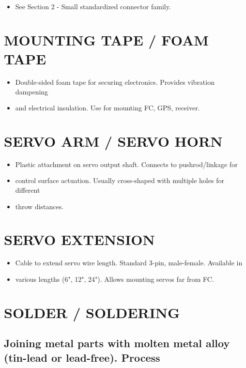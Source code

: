 \documentclass[11pt,letterpaper]{article}
\begin{document}
\begin{itemize}
  \item See Section 2 - Small standardized connector family.
\end{itemize}

\section{MOUNTING TAPE / FOAM TAPE}

\begin{itemize}
  \item Double-sided foam tape for securing electronics. Provides vibration dampening
  \item and electrical insulation. Use for mounting FC, GPS, receiver.
\end{itemize}

\section{SERVO ARM / SERVO HORN}

\begin{itemize}
  \item Plastic attachment on servo output shaft. Connects to pushrod/linkage for
  \item control surface actuation. Usually cross-shaped with multiple holes for different
  \item throw distances.
\end{itemize}

\section{SERVO EXTENSION}

\begin{itemize}
  \item Cable to extend servo wire length. Standard 3-pin, male-female. Available in
  \item various lengths (6", 12", 24"). Allows mounting servos far from FC.
\end{itemize}

\section{SOLDER / SOLDERING}

\subsection{Joining metal parts with molten metal alloy (tin-lead or lead-free). Process}
\end{document}

